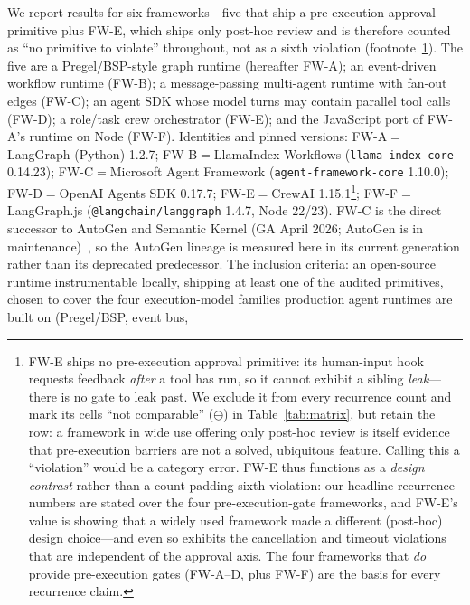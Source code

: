 \documentclass[10pt,journal,compsoc]{IEEEtran}
\begin{document}
We report results for six frameworks---five that ship a pre-execution
approval primitive plus \textsf{FW-E}, which ships only post-hoc review and
is therefore counted as ``no primitive to violate'' throughout, not as a
sixth violation (footnote~\ref{fn:fwe-posthoc}). The five are a Pregel/BSP-style graph runtime
(hereafter \textsf{FW-A}); an event-driven workflow runtime (\textsf{FW-B}); a
message-passing multi-agent runtime with fan-out edges (\textsf{FW-C}); an
agent SDK whose model turns may contain parallel tool calls (\textsf{FW-D}); a
role/task crew orchestrator (\textsf{FW-E}); and the JavaScript port of
\textsf{FW-A}'s runtime on Node (\textsf{FW-F}). Identities and pinned
versions: \textsf{FW-A}${=}$LangGraph (Python) 1.2.7;
\textsf{FW-B}${=}$LlamaIndex Workflows (\texttt{llama-index-core} 0.14.23);
\textsf{FW-C}${=}$Microsoft Agent Framework (\texttt{agent-framework-core}
1.10.0); \textsf{FW-D}${=}$OpenAI Agents SDK 0.17.7;
\textsf{FW-E}${=}$CrewAI 1.15.1\footnote{\label{fn:fwe-posthoc}\textsf{FW-E}
ships no pre-execution approval primitive: its human-input hook requests
feedback \emph{after} a tool has run, so it cannot exhibit a sibling
\emph{leak}---there is no gate to leak past. We exclude it from every
recurrence count and mark its cells ``not comparable'' ($\ominus$) in
Table~\ref{tab:matrix}, but retain the row: a framework in wide use offering
only post-hoc review is itself evidence that pre-execution barriers are not a
solved, ubiquitous feature. Calling this a ``violation'' would be a category
error. \textsf{FW-E} thus functions as a \emph{design contrast} rather than a
count-padding sixth violation: our headline recurrence numbers are stated
over the four pre-execution-gate frameworks, and \textsf{FW-E}'s value is
showing that a widely used framework made a different (post-hoc) design
choice---and even so exhibits the cancellation and timeout violations that
are independent of the approval axis. The four frameworks that \emph{do} provide pre-execution gates
(\textsf{FW-A}--\textsf{D}, plus \textsf{FW-F}) are the basis for every
recurrence claim.}; \textsf{FW-F}${=}$LangGraph.js
(\texttt{@langchain/langgraph} 1.4.7, Node 22/23). \textsf{FW-C} is the
direct successor to AutoGen and Semantic Kernel (GA April 2026; AutoGen is
in maintenance)~\cite{msaf26}, so the AutoGen lineage is measured here in
its current generation rather than its deprecated predecessor. The inclusion criteria: an
open-source runtime instrumentable locally, shipping at least one of the
audited primitives, chosen to cover the four execution-model families
production agent runtimes are built on (Pregel/BSP, event bus,
\end{document}
